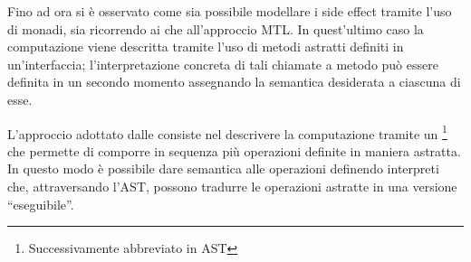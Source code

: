 Fino ad ora si è osservato come sia possibile modellare i side effect tramite l'uso di monadi, sia ricorrendo ai  che all'approccio MTL. In quest'ultimo caso la computazione viene descritta tramite l'uso di metodi astratti definiti in un'interfaccia; l'interpretazione concreta di tali chiamate a metodo può essere definita in un secondo momento assegnando la semantica desiderata a ciascuna di esse.

L'approccio adottato dalle  consiste nel descrivere la computazione tramite un \footnote{Successivamente abbreviato in AST} che permette di comporre in sequenza più operazioni definite in maniera astratta. In questo modo è possibile dare semantica alle operazioni definendo interpreti che, attraversando l'AST, possono tradurre le operazioni astratte in una versione ``eseguibile''.
